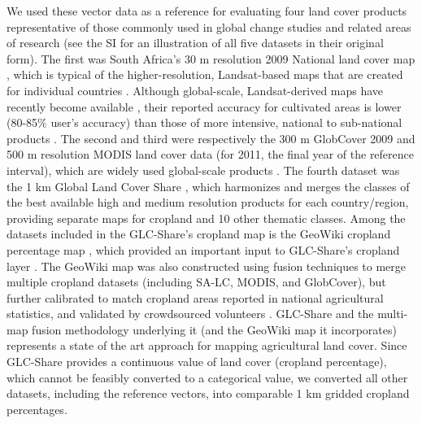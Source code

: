 \documentclass[12 pt, titlepage, a4paper]{article}
\begin{document}
We used these vector data as a reference for evaluating four land cover products representative of those commonly used in global change studies and related areas of research (see the SI for an illustration of all five datasets in their original form). The first was South Africa's 30 m resolution 2009 National land cover map \citep[SA-LC;][]{sanbi_national_2009}, which is typical of the higher-resolution, Landsat-based maps that are created for individual countries \citep[e.g.][]{fry_completion_2009}. Although global-scale, Landsat-derived maps have recently become available \citep{chen_global_2015}, their reported accuracy for cultivated areas is lower (80-85\% user's accuracy) than those of more intensive, national to sub-national products \citep[e.g. 90\% user's accuracy][]{sweeney_mapping_2015}. The second and third were respectively the 300 m GlobCover 2009 \citep{arino_global_2012} and 500 m resolution MODIS land cover \citep{friedl_modis_2010} data (for 2011, the final year of the reference interval), which are widely used global-scale products \citep[e.g.][]{gross_monitoring_2013, shackelford_conservation_2015}. The fourth dataset was the 1 km Global Land Cover Share \citep[GLC-Share;][]{latham_global_2014}, which harmonizes and merges the classes of the best available high and medium resolution products for each country/region, providing separate maps for cropland and 10 other thematic classes. Among the datasets included in the GLC-Share's cropland map is the GeoWiki cropland percentage map \citep{waldner_unified_2016, fritz_mapping_2015}, which provided an important input to GLC-Share's cropland layer \citep{latham_global_2014}. The GeoWiki map was also constructed using fusion techniques to merge multiple cropland datasets (including SA-LC, MODIS, and GlobCover), but further calibrated to match cropland areas reported in national agricultural statistics, and validated by crowdsourced volunteers \citep{fritz_mapping_2015}. GLC-Share and the multi-map fusion methodology underlying it (and the GeoWiki map it incorporates) represents a state of the art approach for mapping agricultural land cover. Since GLC-Share provides a continuous value of land cover (cropland percentage), which cannot be feasibly converted to a categorical value, we converted all other datasets, including the reference vectors, into comparable 1 km gridded cropland percentages. 
\end{document}
